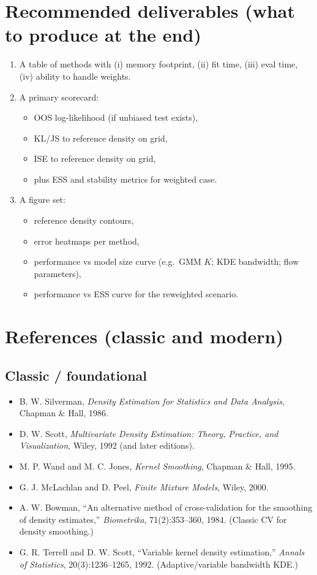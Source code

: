 \documentclass[twocolumn]{notes}
\begin{document}
\section{Recommended deliverables (what to produce at the end)}
\begin{enumerate}[leftmargin=2em]
\item A table of methods with (i) memory footprint, (ii) fit time, (iii) eval time, (iv) ability to handle weights.
\item A primary scorecard:
  \begin{itemize}
  \item OOS log-likelihood (if unbiased test exists),
  \item KL/JS to reference density on grid,
  \item ISE to reference density on grid,
  \item plus ESS and stability metrics for weighted case.
  \end{itemize}
\item A figure set:
  \begin{itemize}
  \item reference density contours,
  \item error heatmaps per method,
  \item performance vs model size curve (e.g.\ GMM $K$; KDE bandwidth; flow parameters),
  \item performance vs ESS curve for the reweighted scenario.
  \end{itemize}
\end{enumerate}

\section{References (classic and modern)}

\subsection*{Classic / foundational}
\begin{itemize}[leftmargin=2em]
\item B. W. Silverman, \emph{Density Estimation for Statistics and Data Analysis}, Chapman \& Hall, 1986.
\item D. W. Scott, \emph{Multivariate Density Estimation: Theory, Practice, and Visualization}, Wiley, 1992 (and later editions).
\item M. P. Wand and M. C. Jones, \emph{Kernel Smoothing}, Chapman \& Hall, 1995.
\item G. J. McLachlan and D. Peel, \emph{Finite Mixture Models}, Wiley, 2000.
\item A. W. Bowman, ``An alternative method of cross-validation for the smoothing of density estimates,'' \emph{Biometrika}, 71(2):353--360, 1984. (Classic CV for density smoothing.)
\item G. R. Terrell and D. W. Scott, ``Variable kernel density estimation,'' \emph{Annals of Statistics}, 20(3):1236--1265, 1992. (Adaptive/variable bandwidth KDE.)
\end{itemize}
\end{document}
